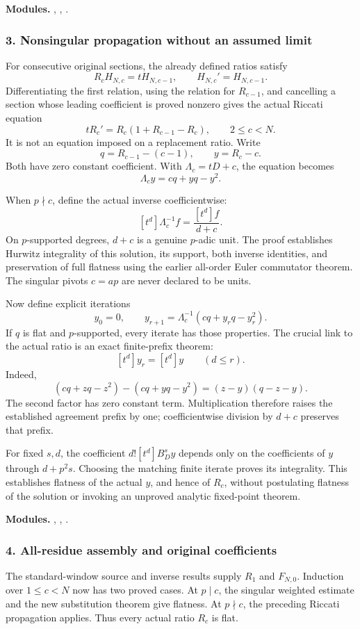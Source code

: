 \textbf{Modules.} , , .
\par\medskip
\subsubsection*{3. Nonsingular propagation without an assumed limit}
For consecutive original sections, the already defined ratios satisfy
\[
 R_cH_{N,c}=tH_{N,c-1},\qquad H_{N,c}'=H_{N,c-1}.
\]
Differentiating the first relation, using the relation for $R_{c-1}$, and cancelling a section whose leading coefficient is proved nonzero gives the actual Riccati equation
\[
 \boxed{tR_c'=R_c(1+R_{c-1}-R_c),\qquad 2\le c<N.}
\]
It is not an equation imposed on a replacement ratio. Write
\[
 q=R_{c-1}-(c-1),\qquad y=R_c-c.
\]
Both have zero constant coefficient. With $\Lambda_c=tD+c$, the equation becomes
\[
 \boxed{\Lambda_c y=cq+yq-y^2.}
\]

When $p\nmid c$, define the actual inverse coefficientwise:
\[
 [t^d]\Lambda_c^{-1}f=\frac{[t^d]f}{d+c}.
\]
On $p$-supported degrees, $d+c$ is a genuine $p$-adic unit. The proof establishes Hurwitz integrality of this solution, its support, both inverse identities, and preservation of full flatness using the earlier all-order Euler commutator theorem. The singular pivots $c=ap$ are never declared to be units.

Now define explicit iterations
\[
 y_0=0,\qquad y_{r+1}=\Lambda_c^{-1}(cq+y_rq-y_r^2).
\]
If $q$ is flat and $p$-supported, every iterate has those properties. The crucial link to the actual ratio is an exact finite-prefix theorem:
\[
 \boxed{[t^d]y_r=[t^d]y\qquad(d\le r).}
\]
Indeed,
\[
 (cq+zq-z^2)-(cq+yq-y^2)=(z-y)(q-z-y).
\]
The second factor has zero constant term. Multiplication therefore raises the established agreement prefix by one; coefficientwise division by $d+c$ preserves that prefix.

For fixed $s,d$, the coefficient $d![t^d]B_D^sy$ depends only on the coefficients of $y$ through $d+p^2s$. Choosing the matching finite iterate proves its integrality. This establishes flatness of the actual $y$, and hence of $R_c$, without postulating flatness of the solution or invoking an unproved analytic fixed-point theorem.

\textbf{Modules.} , , .
\par\medskip
\subsubsection*{4. All-residue assembly and original coefficients}
The standard-window source and inverse results supply $R_1$ and $F_{N,0}$. Induction over $1\le c<N$ now has two proved cases. At $p\mid c$, the singular weighted estimate and the new substitution theorem give flatness. At $p\nmid c$, the preceding Riccati propagation applies. Thus every actual ratio $R_c$ is flat.

